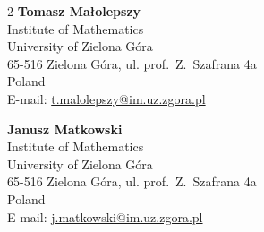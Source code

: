\documentclass[a4paper,12pt]{article}
\theoremstyle{plain}
\theoremstyle{definition}
\theoremstyle{remark}
\begin{document}
\begin{multicols}{2}
\vspace{1cm}
\noindent
\textbf{Tomasz Małolepszy}\\
Institute of Mathematics\\
University of Zielona Góra\\
65-516 Zielona Góra, ul. prof.~Z.~Szafrana 4a\\
Poland\\
E-mail: \href{mailto:t.malolepszy@im.uz.zgora.pl}{t.malolepszy@im.uz.zgora.pl}


\vspace{1cm}
\noindent
\textbf{Janusz Matkowski}\\
Institute of Mathematics\\
University of Zielona Góra\\
65-516 Zielona Góra, ul. prof.~Z.~Szafrana 4a\\
Poland\\
E-mail: \href{mailto:j.matkowski@im.uz.zgora.pl}{j.matkowski@im.uz.zgora.pl}
\end{multicols}
\end{document}
